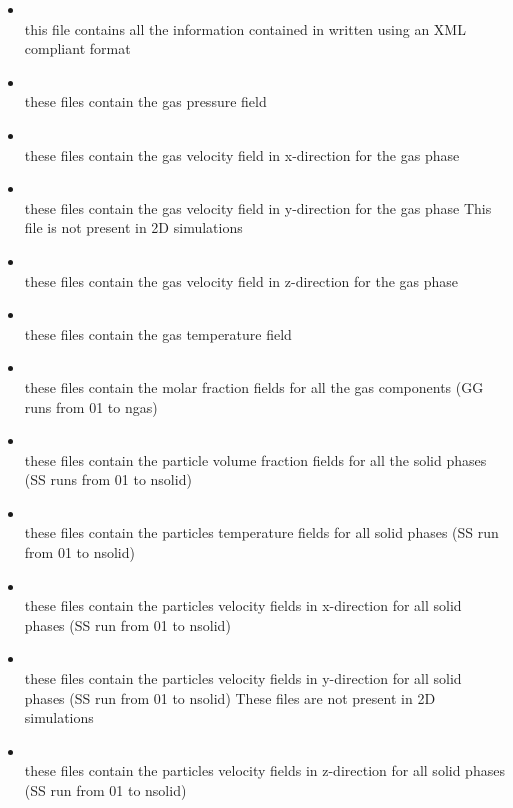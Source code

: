 \begin{itemize}

\item {}  \\
      this file contains all the information contained in 
      written using an XML compliant format

\item {} \\
      these files contain the gas pressure field 

\item {} \\
      these files contain the gas velocity field in x-direction
      for the gas phase

\item {} \\
      these files contain the gas velocity field in y-direction
      for the gas phase
      This file is not present in 2D simulations

\item {} \\
      these files contain the gas velocity field in z-direction
for the gas phase

\item {} \\
      these files contain the gas temperature field 

\item {} \\
      these files contain the molar fraction fields for all the gas 
      components (GG runs from 01 to ngas) 

\item {} \\
      these files contain the particle volume fraction fields for all the 
      solid phases (SS runs from 01 to nsolid) 

\item {} \\
      these files contain the particles temperature fields
      for all solid phases (SS run from 01 to nsolid)

\item {} \\
      these files contain the particles velocity fields in x-direction
      for all solid phases (SS run from 01 to nsolid)

\item {} \\
      these files contain the particles velocity fields in y-direction
      for all solid phases (SS run from 01 to nsolid)
      These files are not present in 2D simulations

\item {} \\
      these files contain the particles velocity fields in z-direction
      for all solid phases (SS run from 01 to nsolid)

\end{itemize}

